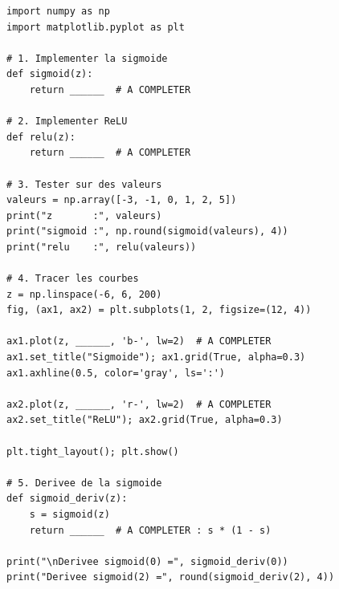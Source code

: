 \begin{pythonbox}
\begin{lstlisting}
import numpy as np
import matplotlib.pyplot as plt

# 1. Implementer la sigmoide
def sigmoid(z):
    return ______  # A COMPLETER

# 2. Implementer ReLU
def relu(z):
    return ______  # A COMPLETER

# 3. Tester sur des valeurs
valeurs = np.array([-3, -1, 0, 1, 2, 5])
print("z       :", valeurs)
print("sigmoid :", np.round(sigmoid(valeurs), 4))
print("relu    :", relu(valeurs))

# 4. Tracer les courbes
z = np.linspace(-6, 6, 200)
fig, (ax1, ax2) = plt.subplots(1, 2, figsize=(12, 4))

ax1.plot(z, ______, 'b-', lw=2)  # A COMPLETER
ax1.set_title("Sigmoide"); ax1.grid(True, alpha=0.3)
ax1.axhline(0.5, color='gray', ls=':')

ax2.plot(z, ______, 'r-', lw=2)  # A COMPLETER
ax2.set_title("ReLU"); ax2.grid(True, alpha=0.3)

plt.tight_layout(); plt.show()

# 5. Derivee de la sigmoide
def sigmoid_deriv(z):
    s = sigmoid(z)
    return ______  # A COMPLETER : s * (1 - s)

print("\nDerivee sigmoid(0) =", sigmoid_deriv(0))
print("Derivee sigmoid(2) =", round(sigmoid_deriv(2), 4))
\end{lstlisting}
\end{pythonbox}


